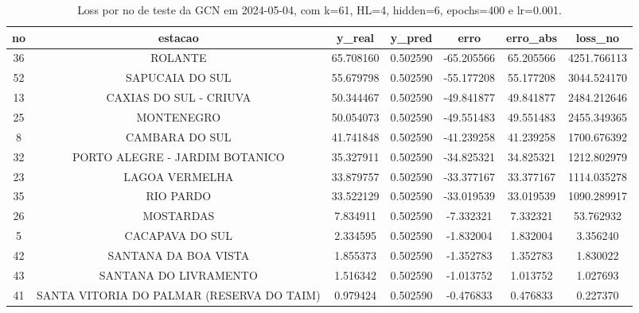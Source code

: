 \begin{table}[h]
\centering
\caption{Loss por no de teste da GCN em 2024-05-04, com k=61, HL=4, hidden=6, epochs=400 e lr=0.001.}
\label{tab:gcn_loss_k61_hl4_h6_e400_d20240504}
\begin{tabular}{ccccccc}
\toprule
no & estacao & y\_real & y\_pred & erro & erro\_abs & loss\_no \\
\midrule
36 & ROLANTE & 65.708160 & 0.502590 & -65.205566 & 65.205566 & 4251.766113 \\
52 & SAPUCAIA DO SUL & 55.679798 & 0.502590 & -55.177208 & 55.177208 & 3044.524170 \\
13 & CAXIAS DO SUL - CRIUVA & 50.344467 & 0.502590 & -49.841877 & 49.841877 & 2484.212646 \\
25 & MONTENEGRO & 50.054073 & 0.502590 & -49.551483 & 49.551483 & 2455.349365 \\
8 & CAMBARA DO SUL & 41.741848 & 0.502590 & -41.239258 & 41.239258 & 1700.676392 \\
32 & PORTO ALEGRE - JARDIM BOTANICO & 35.327911 & 0.502590 & -34.825321 & 34.825321 & 1212.802979 \\
23 & LAGOA VERMELHA & 33.879757 & 0.502590 & -33.377167 & 33.377167 & 1114.035278 \\
35 & RIO PARDO & 33.522129 & 0.502590 & -33.019539 & 33.019539 & 1090.289917 \\
26 & MOSTARDAS & 7.834911 & 0.502590 & -7.332321 & 7.332321 & 53.762932 \\
5 & CACAPAVA DO SUL & 2.334595 & 0.502590 & -1.832004 & 1.832004 & 3.356240 \\
42 & SANTANA DA BOA VISTA & 1.855373 & 0.502590 & -1.352783 & 1.352783 & 1.830022 \\
43 & SANTANA DO LIVRAMENTO & 1.516342 & 0.502590 & -1.013752 & 1.013752 & 1.027693 \\
41 & SANTA VITORIA DO PALMAR (RESERVA DO TAIM) & 0.979424 & 0.502590 & -0.476833 & 0.476833 & 0.227370 \\
\bottomrule
\end{tabular}
\end{table}
